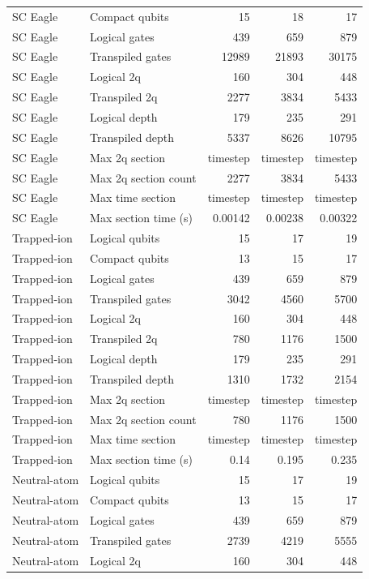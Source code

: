 \begin{table}
\begin{tabular}{llrrr}
SC Eagle & Compact qubits & 15 & 18 & 17 \\
SC Eagle & Logical gates & 439 & 659 & 879 \\
SC Eagle & Transpiled gates & 12989 & 21893 & 30175 \\
SC Eagle & Logical 2q & 160 & 304 & 448 \\
SC Eagle & Transpiled 2q & 2277 & 3834 & 5433 \\
SC Eagle & Logical depth & 179 & 235 & 291 \\
SC Eagle & Transpiled depth & 5337 & 8626 & 10795 \\
SC Eagle & Max 2q section & timestep & timestep & timestep \\
SC Eagle & Max 2q section count & 2277 & 3834 & 5433 \\
SC Eagle & Max time section & timestep & timestep & timestep \\
SC Eagle & Max section time (s) & 0.00142 & 0.00238 & 0.00322 \\
\hline
Trapped-ion & Logical qubits & 15 & 17 & 19 \\
Trapped-ion & Compact qubits & 13 & 15 & 17 \\
Trapped-ion & Logical gates & 439 & 659 & 879 \\
Trapped-ion & Transpiled gates & 3042 & 4560 & 5700 \\
Trapped-ion & Logical 2q & 160 & 304 & 448 \\
Trapped-ion & Transpiled 2q & 780 & 1176 & 1500 \\
Trapped-ion & Logical depth & 179 & 235 & 291 \\
Trapped-ion & Transpiled depth & 1310 & 1732 & 2154 \\
Trapped-ion & Max 2q section & timestep & timestep & timestep \\
Trapped-ion & Max 2q section count & 780 & 1176 & 1500 \\
Trapped-ion & Max time section & timestep & timestep & timestep \\
Trapped-ion & Max section time (s) & 0.14 & 0.195 & 0.235 \\
\hline
Neutral-atom & Logical qubits & 15 & 17 & 19 \\
Neutral-atom & Compact qubits & 13 & 15 & 17 \\
Neutral-atom & Logical gates & 439 & 659 & 879 \\
Neutral-atom & Transpiled gates & 2739 & 4219 & 5555 \\
Neutral-atom & Logical 2q & 160 & 304 & 448 \\

\end{tabular}
\end{table}
